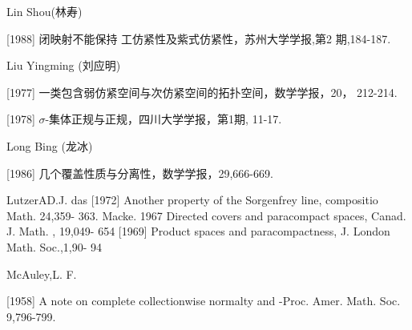 \documentclass[main.tex]{subfiles}
\begin{document}
\noindent Lin Shou(林寿)

[1988] 闭映射不能保持 工仿紧性及紫式仿紧性，苏州大学学报,第2
期,184-187.

\noindent Liu Yingming (刘应明)

[1977] 一类包含弱仿紧空间与次仿紧空间的拓扑空间，数学学报，20，
212-214.

[1978] $\sigma$-集体正规与正规，四川大学学报，第1期, 11-17.

\noindent Long Bing (龙冰)

[1986] 几个覆盖性质与分离性，数学学报，29,666-669.

\noindent LutzerAD.J.
das [1972]
Another property of the Sorgenfrey line, compositio Math. 24,359-
363.
Macke.
1967 Directed covers and paracompact spaces, Canad. J. Math. , 19,049-
654
[1969] Product spaces and paracompactness, J. London Math. Soc.,1,90-
94

\noindent McAuley,L. F.

[1958]
A note on complete collectionwise normalty and
-Proc. Amer. Math. Soc. 9,796-799.
\end{document}
